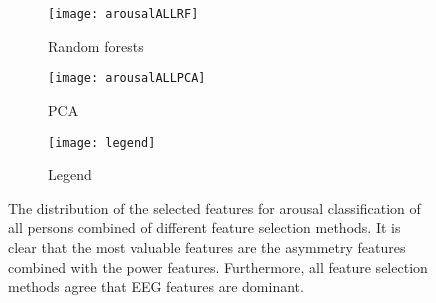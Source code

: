 \begin{figure}[!tbp]
  \begin{subfigure}[b]{0.3\textwidth}
    \texttt{[image: arousalALLRF]}
    \caption{Random forests}
  \end{subfigure}
  \hfill
  \begin{subfigure}[b]{0.3\textwidth}
    \texttt{[image: arousalALLPCA]}
    \caption{PCA}
  \end{subfigure}
  \hfill
  \begin{subfigure}[b]{0.3\textwidth}
    \texttt{[image: legend]}
    \caption{Legend\label{arousalpieslegend}}
  \end{subfigure}
\caption{The distribution of the selected features for arousal classification of all persons combined of different feature selection methods. It is clear that the most valuable features are the asymmetry features combined with the power features. Furthermore, all feature selection methods agree that EEG features are dominant.\label{arousalpies}}
\end{figure}

\clearpage

